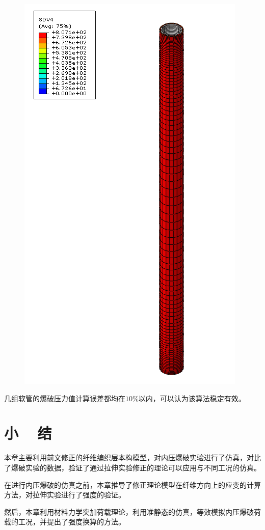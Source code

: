 \begin{figure}[!htp]
{		\includegraphics[height=0.33\textheight]{figure/chap6/2}
		\label{fig:chap6-2}
	}
	\label{fig:chap6-hose-burst}
\end{figure}


几组软管的爆破压力值计算误差都均在$ 10\% $以内，可以认为该算法稳定有效。


\section{小 ~ 结}

本章主要利用前文修正的纤维编织层本构模型，对内压爆破实验进行了仿真，对比了爆破实验的数据，验证了通过拉伸实验修正的理论可以应用与不同工况的仿真。

在进行内压爆破的仿真之前，本章推导了修正理论模型在纤维方向上的应变的计算方法，对拉伸实验进行了强度的验证。

然后，本章利用材料力学突加荷载理论，利用准静态的仿真，等效模拟内压爆破荷载的工况，并提出了强度换算的方法。
